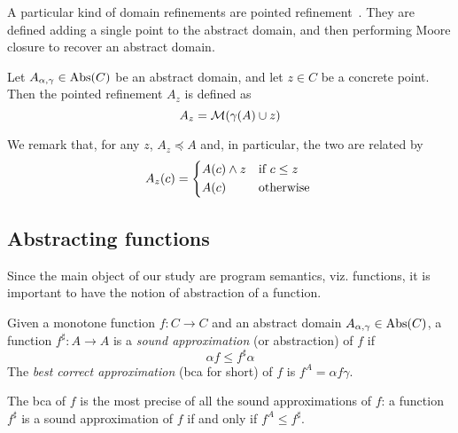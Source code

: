 A particular kind of domain refinements are pointed refinement~\cite{BGGR22}. They are defined adding a single point to the abstract domain, and then performing Moore closure to recover an abstract domain.
\begin{definition}
	Let $A_{\alpha, \gamma} \in \text{\normalfont Abs}(C)$ be an abstract domain, and let $z \in C$ be a concrete point. Then the pointed refinement $A_z$ is defined as
	\[
	A_z = \mathcal{M}(\gamma(A) \cup z)
	\]
\end{definition}
We remark that, for any $z$, $A_z \preceq A$ and, in particular, the two are related by
\[
A_z(c) = \begin{cases*}
	A(c) \wedge z & if $c \le z$ \\
	A(c)          & otherwise
\end{cases*}
\]

\subsection{Abstracting functions}
Since the main object of our study are program semantics, viz. functions, it is important to have the notion of abstraction of a function.
\begin{definition}\label{def:bg:sound-abstraction}
	Given a monotone function $f : C \rightarrow C$ and an abstract domain $A_{\alpha, \gamma} \in \text{\normalfont Abs}(C)$, a function $f^{\sharp} : A \rightarrow A$ is a \emph{sound approximation} (or abstraction) of $f$ if
	\[
	\alpha f \le f^{\sharp} \alpha
	\]
	The \emph{best correct approximation} (bca for short) of $f$ is $f^{A} = \alpha f \gamma$.
\end{definition}
The bca of $f$ is the most precise of all the sound approximations of $f$: a function $f^{\sharp}$ is a sound approximation of $f$ if and only if $f^{A} \le f^{\sharp}$.

